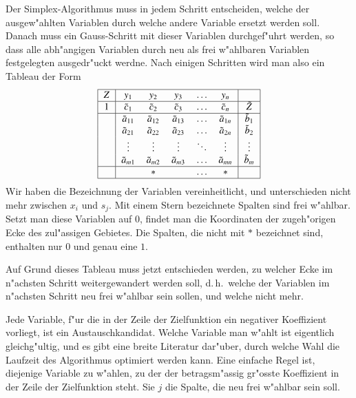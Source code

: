 Der Simplex-Algorithmus muss in jedem Schritt entscheiden,
welche der ausgew"ahlten Variablen durch welche andere Variable
ersetzt werden soll.
Danach muss ein Gauss-Schritt mit dieser Variablen durchgef"uhrt werden,
so dass alle abh"angigen Variablen durch neu als frei w"ahlbaren Variablen
festgelegten ausgedr"uckt werdne. Nach einigen Schritten wird man also
ein Tableau der Form
\begin{equation}
\begin{tabular}{|>{$}c<{$}|>{$}c<{$}>{$}c<{$}>{$}c<{$}>{$}c<{$}>{$}c<{$}|>{$}c<{$}|}
\hline
Z&y_1&y_2&y_3&\dots&y_n& \\
\hline
1&\tilde c_1&\tilde c_2&\tilde c_3&\dots&\tilde c_n&\tilde Z\\
\hline
&\tilde a_{11}&\tilde a_{12}&\tilde a_{13}&\dots&\tilde a_{1n}&\tilde b_1\\
&\tilde a_{21}&\tilde a_{22}&\tilde a_{23}&\dots&\tilde a_{2n}&\tilde b_2\\
&\vdots&\vdots&\vdots&\ddots&\vdots&\vdots\\
&\tilde a_{m1}&\tilde a_{m2}&\tilde a_{m3}&\dots&\tilde a_{mn}&\tilde b_m\\
\hline
& &*& &\dots&*&\\
\hline
\end{tabular}
\end{equation}
Wir haben die Bezeichnung der Variablen vereinheitlicht, und unterschieden
nicht mehr zwischen $x_i$ und $s_j$.
Mit einem Stern bezeichnete Spalten sind frei w"ahlbar. Setzt man diese
Variablen auf $0$, findet man die Koordinaten der zugeh"origen Ecke
des zul"assigen Gebietes. Die Spalten, die nicht mit $*$ bezeichnet sind,
enthalten nur $0$ und genau eine $1$.

Auf Grund dieses Tableau muss jetzt entschieden
werden, zu welcher Ecke im n"achsten Schritt weitergewandert werden soll,
d.\,h.~welche der Variablen im n"achsten Schritt neu frei w"ahlbar
sein sollen, und welche nicht mehr. 

Jede Variable, f"ur die in der Zeile der Zielfunktion ein negativer
Koeffizient vorliegt, ist ein Austauschkandidat. Welche Variable
man w"ahlt ist eigentlich gleichg"ultig, und es gibt eine breite Literatur
dar"uber, durch welche Wahl die Laufzeit des Algorithmus
optimiert werden kann.
Eine einfache Regel ist, diejenige Variable zu w"ahlen, zu der der
betragsm"assig gr"osste Koeffizient in der Zeile der Zielfunktion
steht. Sie $j$ die Spalte, die neu frei w"ahlbar sein soll.

